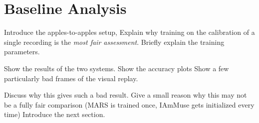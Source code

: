 \section{Baseline Analysis}
\label{section: evaluation - baseline analysis}

Introduce the apples-to-apples setup,
Explain why training on the calibration of a single recording is the \textit{most fair assessment}.
Briefly explain the training parameters.

Show the results of the two systems.
Show the accuracy plots
Show a few particularly bad frames of the visual replay.

Discuss why this gives such a bad result.
Give a small reason why this may not be a fully fair comparison (MARS is trained once, IAmMuse gets initialized every time)
Introduce the next section.


